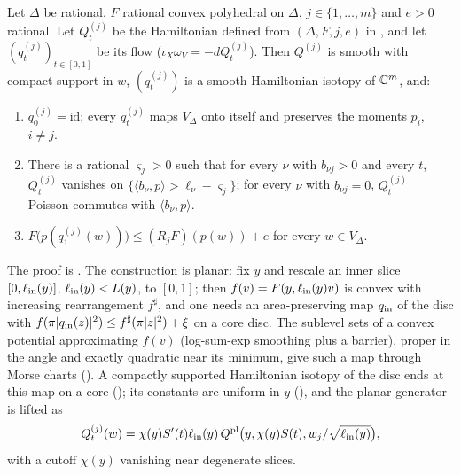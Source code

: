 \begin{theorem}\label{thm:cmp-realisation}
Let $\Delta$ be rational, $F$ rational convex polyhedral on $\Delta$, $j\in\{1,\dots,m\}$ and $e>0$ rational. Let
$Q^{(j)}_t$ be the Hamiltonian defined from $(\Delta,F,j,e)$ in , and let
$(q^{(j)}_t)_{t\in[0,1]}$ be its flow ($\iota_{X}\omega_V=-dQ^{(j)}_t$). Then $Q^{(j)}$ is smooth with compact support
in $w$, $(q^{(j)}_t)$ is a smooth Hamiltonian isotopy of $\mathbb{C}^m$, and:
\begin{enumerate}[label=(\alph*)]
\item $q^{(j)}_0=\mathrm{id}$; every $q^{(j)}_t$ maps $V_\Delta$ onto itself and preserves the moments $p_i$, $i\ne j$.
\item There is a rational $\varsigma_j>0$ such that for every $\nu$ with $b_{\nu j}>0$ and every $t$, $Q^{(j)}_t$
 vanishes on $\{\langle b_\nu,p\rangle>\ell_\nu-\varsigma_j\}$; for every $\nu$ with $b_{\nu j}=0$, $Q^{(j)}_t$
 Poisson-commutes with $\langle b_\nu,p\rangle$.
\item $F\bigl(p(q^{(j)}_1(w))\bigr)\le(R_jF)(p(w))+e$ for every $w\in V_\Delta$.
\end{enumerate}
\end{theorem}

The proof is . The construction is planar: fix $y$ and rescale an inner slice
$[0,\ell_{\rm in}(y)]$, $\ell_{\rm in}(y)<L(y)$, to $[0,1]$; then $f(v)=F(y,\ell_{\rm in}(y)v)$ is convex with increasing
rearrangement $f^\sharp$, and one needs an area-preserving map $q_{\rm in}$ of the disc with
$f(\pi|q_{\rm in}(z)|^2)\le f^\sharp(\pi|z|^2)+\xi$ on a core disc. The sublevel sets of a convex potential approximating
$f(v)$ (log-sum-exp smoothing plus a barrier), proper in the angle and exactly quadratic near its minimum, give such a
map through Morse charts (). A compactly supported Hamiltonian isotopy of the disc ends
at this map on a core (); its constants are uniform in $y$
(), and the planar generator is lifted as
\[
 Q^{(j)}_t(w)=\chi(y)S'(t)\ell_{\rm in}(y)\,
 Q^{\rm pl}\bigl(y,\chi(y)S(t),w_j/\sqrt{\ell_{\rm in}(y)}\bigr),
\]
with a cutoff $\chi(y)$ vanishing near degenerate slices.

